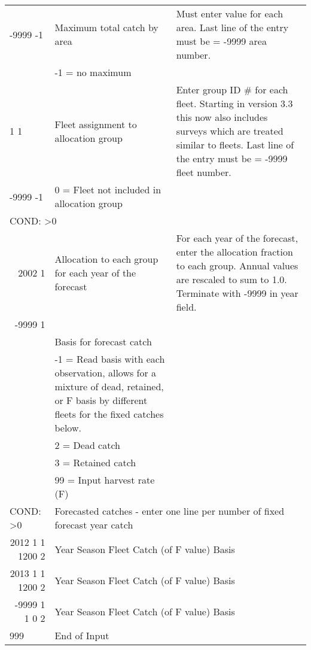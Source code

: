 \begin{landscape}
\begin{longtable}{p{3cm} p{7cm} p{11cm}}
  \hline
  -9999 -1 & Maximum total catch by area & \multirow{1}{1cm}[-0.1cm]{\parbox{11cm}{Must enter value for each area. Last line of the entry must be = -9999 area number.}} \\
     & -1 = no maximum & \\
     
  \hline
  1 1  & Fleet assignment to allocation group & \multirow{1}{1cm}[-0.1cm]{\parbox{11cm}{Enter group ID \# for each fleet. Starting in version 3.3 this now also includes surveys which are treated similar to fleets. Last line of the entry must be = -9999 fleet number.}} \\
  -9999 -1  & 0 = Fleet not included in allocation group & \\
    
  \hline
  \multicolumn{3}{l}{COND: >0 } \\
  \multicolumn{1}{r}{2002 1}  & Allocation to each group for each year of the forecast & For each year of the forecast, enter the allocation fraction to each group. Annual values are rescaled to sum to 1.0. Terminate with -9999 in year field.\\
  \multicolumn{1}{r}{-9999 1} & & \\
  
  
  \pagebreak %
  -1 & Basis for forecast catch & \\
    & -1 = Read basis with each observation, allows for a mixture of dead, retained, or F basis by different fleets for the fixed catches below. & \\
    & 2 = Dead catch & \\
    & 3 = Retained catch & \\
    & 99 = Input harvest rate (F) & \\
    
  \hline
  \multicolumn{1}{l}{COND: >0 }& \multicolumn{2}{l}{Forecasted catches - enter one line per number of fixed forecast year catch }\\
  \multicolumn{1}{r}{2012 1 1 1200 2}  & \multicolumn{2}{l}{Year Season Fleet Catch (of F value) Basis}  \\
  \multicolumn{1}{r}{2013 1 1 1200 2}  & \multicolumn{2}{l}{Year Season Fleet Catch (of F value) Basis}  \\
  \multicolumn{1}{r}{-9999 1 1 0   2}  & \multicolumn{2}{l}{Year Season Fleet Catch (of F value) Basis}  \\
  
  \hline
  999 & End of Input & \\

  \end{longtable}
\end{landscape}
